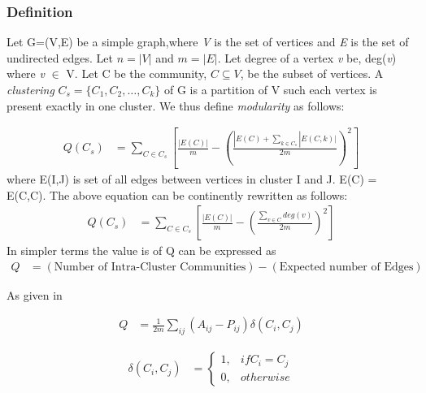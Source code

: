\subsubsection{Definition}
Let G=(V,E) be a simple graph,where \textit{V} is the set of vertices and \textit{E} is the set of undirected edges. Let $n=|V|$ and $m=|E|$. Let degree of a vertex \textit{v} be, deg(\textit{v}) where \textit{v} $\in$ V. Let C be the community, $C \subseteq V$, be the subset of vertices. A \textit{clustering} $C_s =\{C_1,C_2, \ldots, C_k\}$ of G is a partition of V such each vertex is present exactly in one cluster.  We thus define \textit{modularity } as follows: \cite{modularityNP}

\begin{equation} \label{eq1}
\begin{split}
Q(C_s) &= \sum_{C \in C_s}\left[ \frac{|E(C)|}{m} - \left( \frac{|E(C)+\sum_{k \in C_s}|E(C,k)|}{2m} \right)^2 \right]
\end{split}
\end{equation}
where E(I,J) is set of all edges between vertices in cluster I and J. E(C) = E(C,C).
The above equation can be continently rewritten as follows: 
\begin{equation} \label{eq1}
\begin{split}
Q(C_s) &= \sum_{C \in C_s}\left[ \frac{|E(C)|}{m} - \left( \frac{\sum_{v \in C}deg(v)}{2m} \right)^2 \right]
\end{split}
\end{equation}
In simpler terms the value is of Q can be expressed as 
\begin{equation} \label{eq1}
\begin{split}
Q &= \left( \text{Number of Intra-Cluster Communities} \right) - (\text{Expected number of Edges})
\end{split}
\end{equation}

As given in \cite{louvain}

\begin{equation}
    \begin{split}
Q &= \frac{1}{2m} \sum_{ij} \left(A_{ij} - P_{ij}\right) \delta(C_i,C_j)
\end{split}
    \end{equation}

\begin{equation}
\begin{split}
\delta(C_i,C_j) &= \begin{cases} 1 ,& if C_i = C_j \\
 0,& otherwise
 \end{cases}
\end{split}
\end{equation}

